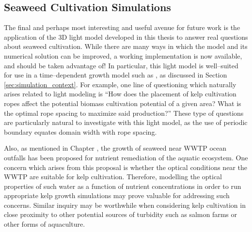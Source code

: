 \subsection{Seaweed Cultivation Simulations}
The final and perhaps most interesting and useful avenue for future work is the application of the 3D light model developed in this thesis to answer real questions about seaweed cultivation.
While there are many ways in which the model and its numerical solution can be improved, a working implementation is now available, and should be taken advantage of!
In particular, this light model is well--suited for use in a time--dependent growth model such as \cite{broch_modelling_2012}, as discussed in Section \ref{sec:simulation_context}.
For example, one line of questioning which naturally arises related to light modeling is ``How does the placement of kelp cultivation ropes affect the potential biomass cultivation potential of a given area?
What is the optimal rope spacing to maximize said production?''
These type of questions are particularly natural to investigate with this light model, as the use of periodic boundary equates domain width with rope spacing.

Also, as mentioned in Chapter \Rom{\ref{chap:introduction}}, the growth of seaweed near WWTP ocean outfalls has been proposed for nutrient remediation of the aquatic ecosystem.
One concern which arises from this proposal is whether the optical conditions near the WWTP are suitable for kelp cultivation.
Therefore, modelling the optical properties of such water as a function of nutrient concentrations in order to run appropriate kelp growth simulations may prove valuable for addressing such concerns.
Similar inquiry may be worthwhile when considering kelp cultivation in close proximity to other potential sources of turbidity such as salmon farms \cite{broch_modelling_2013} or other forms of aquaculture.
